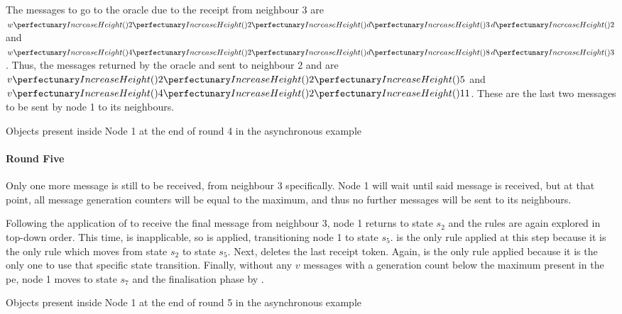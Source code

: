 The messages to go to the oracle due to the receipt from neighbour 3 are \(\cpvw{2}{2}{\cpfunc{d}{3} \, \cpfunc{d}{2}}\) and \(\cpvw{4}{2}{\cpfunc{d}{8} \, \cpfunc{d}{3}}\).  Thus, the messages returned by the oracle and sent to neighbour 2 and are \(\cpvv{2}{2}{5}\) and \(\cpvv{4}{2}{11}\).  These are the last two messages to be sent by node 1 to its neighbours.

\begin{cpobjectsfloat}
\begin{cpobjects}
\end{cpobjects}
\caption{\label{objs:nmp:ex4}Objects present inside Node 1 at the end of round 4 in the asynchronous  example}
\end{cpobjectsfloat}

\paragraph{Round Five}
Only one more message is still to be received, from neighbour 3 specifically. Node 1 will wait until said message is received, but at that point, all message generation counters will be equal to the maximum, and thus no further messages will be sent to its neighbours.

Following the application of  to receive the final message from neighbour 3, node 1 returns to state \(s_2\) and the rules are again explored in top-down order.  This time,  is inapplicable, so  is applied, transitioning node 1 to state \(s_5\).   is the only rule applied at this step because it is the only rule which moves from state \(s_2\) to state \(s_5\).  Next,  deletes the last receipt token.  Again,  is the only rule applied because it is the only one to use that specific state transition.  Finally, without any \(v\) messages with a generation count below the maximum present in the \gls{pe}, node 1 moves to state \(s_7\) and the finalisation phase by .

\begin{cpobjectsfloat}
\begin{cpobjects}
\end{cpobjects}
\caption{\label{objs:nmp:ex5}Objects present inside Node 1 at the end of round 5 in the asynchronous  example}
\end{cpobjectsfloat}


